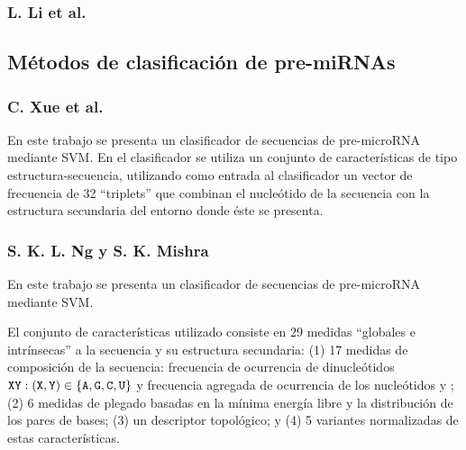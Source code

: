 \documentclass[12pt,bibliography=oldstyle,DIV=12,parskip=half-]{scrartcl}
\begin{document}
\subsubsection*{L. Li et al. \cite{lili}}

%
%
\subsection{Métodos de clasificación de pre-miRNAs}
\subsubsection{C. Xue et al. \cite{xue}}
%
En este trabajo se presenta un clasificador de secuencias de
pre-microRNA mediante SVM.  En el clasificador se utiliza un conjunto
de características de tipo estructura-secuencia, utilizando como
entrada al clasificador un vector de frecuencia de 32 ``triplets'' que
combinan el nucleótido de la secuencia con la estructura secundaria
del entorno donde éste se presenta.
%
\subsubsection{S. K. L. Ng y S. K. Mishra \cite{ng}}
%
En este trabajo se presenta un clasificador de secuencias de
pre-microRNA mediante SVM.

El conjunto de características utilizado consiste en 29 medidas
``globales e intrínsecas'' a la secuencia y su estructura secundaria:
(1) 17 medidas de composición de la secuencia: frecuencia de
ocurrencia de dinucleótidos
${\tt XY}:({\tt X},{\tt Y})\in\{{\tt A},{\tt G},{\tt C},{\tt U}\}$
y frecuencia agregada de ocurrencia de los nucleótidos  y
; (2) 6 medidas de plegado basadas en la mínima energía libre
y la distribución de los pares de bases; (3) un descriptor
topológico; y (4) 5 variantes normalizadas de estas características.
\end{document}
